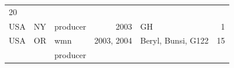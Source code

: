 \documentclass[fleqn,10pt,lineno]{wlpeerj} %
\theoremstyle{definition}
\theoremstyle{definition}
\theoremstyle{definition}
\theoremstyle{remark}
\begin{document}
\begin{longtable}[]{@{}lllrlr@{}}
\begin{minipage}[t]{0.04\columnwidth}
20\strut
\end{minipage}\tabularnewline
\begin{minipage}[t]{0.11\columnwidth}\raggedright\strut
USA\strut
\end{minipage} & \begin{minipage}[t]{0.08\columnwidth}\raggedright\strut
NY\strut
\end{minipage} & \begin{minipage}[t]{0.12\columnwidth}\raggedright\strut
producer\strut
\end{minipage} & \begin{minipage}[t]{0.19\columnwidth}\raggedleft\strut
2003\strut
\end{minipage} & \begin{minipage}[t]{0.29\columnwidth}\raggedright\strut
GH\strut
\end{minipage} & \begin{minipage}[t]{0.04\columnwidth}\raggedleft\strut
1\strut
\end{minipage}\tabularnewline
\begin{minipage}[t]{0.11\columnwidth}\raggedright\strut
USA\strut
\end{minipage} & \begin{minipage}[t]{0.08\columnwidth}\raggedright\strut
OR\strut
\end{minipage} & \begin{minipage}[t]{0.12\columnwidth}\raggedright\strut
wmn\strut
\end{minipage} & \begin{minipage}[t]{0.19\columnwidth}\raggedleft\strut
2003, 2004\strut
\end{minipage} & \begin{minipage}[t]{0.29\columnwidth}\raggedright\strut
Beryl, Bunsi, G122\strut
\end{minipage} & \begin{minipage}[t]{0.04\columnwidth}\raggedleft\strut
15\strut
\end{minipage}\tabularnewline
\begin{minipage}[t]{0.11\columnwidth}\raggedright\strut
\strut
\end{minipage} & \begin{minipage}[t]{0.08\columnwidth}\raggedright\strut
\strut
\end{minipage} & \begin{minipage}[t]{0.12\columnwidth}\raggedright\strut
producer\strut
\end{minipage} & \begin{minipage}[t]{0.19\columnwidth}\raggedleft\strut

\end{minipage}
\end{longtable}
\end{document}
